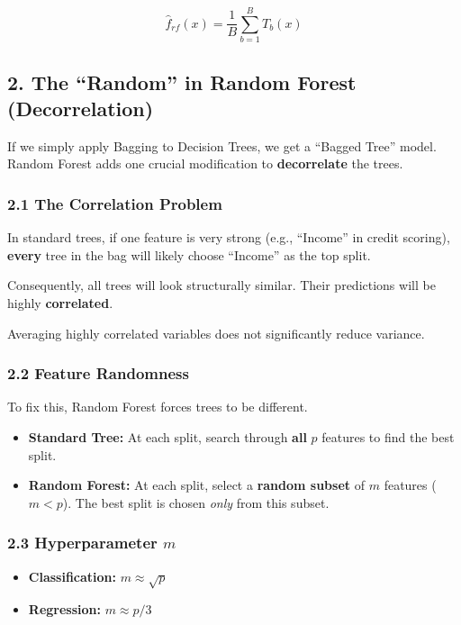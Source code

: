 \documentclass[
  italian,
  11pt,
]{article}
\begin{document}
\[\hat{f}_{rf}(x) = \frac{1}{B} \sum_{b=1}^{B} T_b(x)\]

\subsection{2. The ``Random'' in Random Forest
(Decorrelation)}\label{the-random-in-random-forest-decorrelation}

If we simply apply Bagging to Decision Trees, we get a ``Bagged Tree''
model. Random Forest adds one crucial modification to
\textbf{decorrelate} the trees.

\subsubsection{2.1 The Correlation
Problem}\label{the-correlation-problem}

In standard trees, if one feature is very strong (e.g., ``Income'' in
credit scoring), \textbf{every} tree in the bag will likely choose
``Income'' as the top split.

Consequently, all trees will look structurally similar. Their
predictions will be highly \textbf{correlated}.

Averaging highly correlated variables does not significantly reduce
variance.

\subsubsection{2.2 Feature Randomness}\label{feature-randomness}

To fix this, Random Forest forces trees to be different.

\begin{itemize}
\item
  \textbf{Standard Tree:} At each split, search through \textbf{all}
  \(p\) features to find the best split.
\item
  \textbf{Random Forest:} At each split, select a \textbf{random subset}
  of \(m\) features (\(m < p\)). The best split is chosen \emph{only}
  from this subset.
\end{itemize}

\subsubsection{\texorpdfstring{2.3 Hyperparameter
\(m\)}{2.3 Hyperparameter m}}\label{hyperparameter-m}

\begin{itemize}
\item
  \textbf{Classification:} \(m \approx \sqrt{p}\)
\item
  \textbf{Regression:} \(m \approx p/3\)
\end{itemize}
\end{document}
